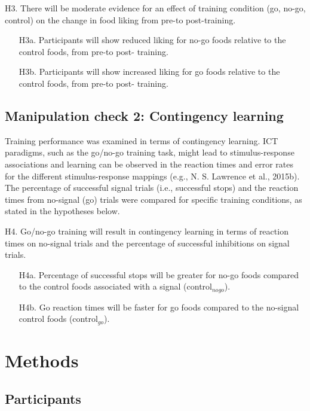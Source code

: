 \documentclass[man,floatsintext]{apa6}
\begin{document}
\noindent H3. There will be moderate evidence for an effect of training
condition (go, no-go, control) on the change in food liking from pre-to
post-training.

\begin{itemize}
\item[H3a.] Participants will show reduced liking for no-go foods relative to the control foods, from pre-to post- training.
\item[H3b.] Participants will show increased liking for go foods relative to the control foods, from pre-to post- training.
\end{itemize}

\subsection{Manipulation check 2: Contingency
learning}\label{manipulation-check-2-contingency-learning}

Training performance was examined in terms of contingency learning. ICT
paradigms, such as the go/no-go training task, might lead to
stimulus-response associations and learning can be observed in the
reaction times and error rates for the different stimulus-response
mappings (e.g., N. S. Lawrence et al., 2015b). The percentage of
successful signal trials (i.e., successful stops) and the reaction times
from no-signal (go) trials were compared for specific training
conditions, as stated in the hypotheses below.

\noindent H4. Go/no-go training will result in contingency learning in
terms of reaction times on no-signal trials and the percentage of
successful inhibitions on signal trials.

\begin{itemize}
\item[H4a.] Percentage of successful stops will be greater for no-go foods compared to the control foods associated with a signal (control$_{nogo}$).
\item[H4b.] Go reaction times will be faster for go foods compared to the no-signal control foods (control$_{go}$).
\end{itemize}

\section{Methods}\label{methods}

\subsection{Participants}\label{participants}
\end{document}
